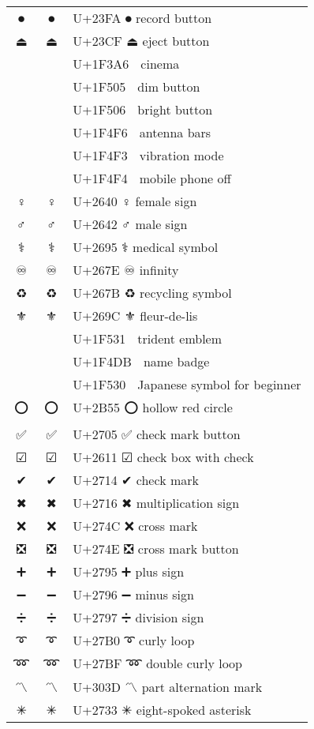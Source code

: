 \documentclass[a4paper,12pt]{ltjarticle}
\newcommand{\fontA}[1]{{\fontspec[RawFeature={mode=harf,+dist,+ccmp}]{Segoe UI Emoji} #1}}
\newcommand{\fontB}[1]{{\fontspec[RawFeature={mode=harf,+dist,+ccmp}]{Noto Color Emoji} #1}}
\begin{document}
\begin{longtable}[c]{ccp{0.8\linewidth}}
\fontA{⏺}&\fontB{⏺}&U+23FA ⏺ record button\\
\fontA{⏏}&\fontB{⏏}&U+23CF ⏏ eject button\\
\fontA{🎦}&\fontB{🎦}&U+1F3A6 🎦 cinema\\
\fontA{🔅}&\fontB{🔅}&U+1F505 🔅 dim button\\
\fontA{🔆}&\fontB{🔆}&U+1F506 🔆 bright button\\
\fontA{📶}&\fontB{📶}&U+1F4F6 📶 antenna bars\\
\fontA{📳}&\fontB{📳}&U+1F4F3 📳 vibration mode\\
\fontA{📴}&\fontB{📴}&U+1F4F4 📴 mobile phone off\\
\fontA{♀}&\fontB{♀}&U+2640 ♀ female sign\\
\fontA{♂}&\fontB{♂}&U+2642 ♂ male sign\\
\fontA{⚕}&\fontB{⚕}&U+2695 ⚕ medical symbol\\
\fontA{♾}&\fontB{♾}&U+267E ♾ infinity\\
\fontA{♻}&\fontB{♻}&U+267B ♻ recycling symbol\\
\fontA{⚜}&\fontB{⚜}&U+269C ⚜ fleur-de-lis\\
\fontA{🔱}&\fontB{🔱}&U+1F531 🔱 trident emblem\\
\fontA{📛}&\fontB{📛}&U+1F4DB 📛 name badge\\
\fontA{🔰}&\fontB{🔰}&U+1F530 🔰 Japanese symbol for beginner\\
\fontA{⭕}&\fontB{⭕}&U+2B55 ⭕ hollow red circle\\
\fontA{✅}&\fontB{✅}&U+2705 ✅ check mark button\\
\fontA{☑}&\fontB{☑}&U+2611 ☑ check box with check\\
\fontA{✔}&\fontB{✔}&U+2714 ✔ check mark\\
\fontA{✖}&\fontB{✖}&U+2716 ✖ multiplication sign\\
\fontA{❌}&\fontB{❌}&U+274C ❌ cross mark\\
\fontA{❎}&\fontB{❎}&U+274E ❎ cross mark button\\
\fontA{➕}&\fontB{➕}&U+2795 ➕ plus sign\\
\fontA{➖}&\fontB{➖}&U+2796 ➖ minus sign\\
\fontA{➗}&\fontB{➗}&U+2797 ➗ division sign\\
\fontA{➰}&\fontB{➰}&U+27B0 ➰ curly loop\\
\fontA{➿}&\fontB{➿}&U+27BF ➿ double curly loop\\
\fontA{〽}&\fontB{〽}&U+303D 〽 part alternation mark\\
\fontA{✳}&\fontB{✳}&U+2733 ✳ eight-spoked asterisk\\

\end{longtable}
\end{document}
